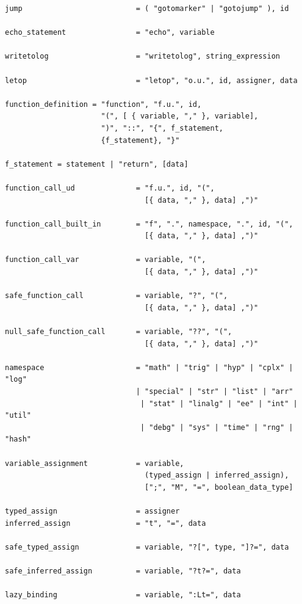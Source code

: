 \begin{verbatim}
jump                          = ( "gotomarker" | "gotojump" ), id

echo_statement                = "echo", variable

writetolog                    = "writetolog", string_expression

letop                         = "letop", "o.u.", id, assigner, data

function_definition = "function", "f.u.", id, 
                      "(", [ { variable, "," }, variable], 
                      ")", "::", "{", f_statement, 
                      {f_statement}, "}"

f_statement = statement | "return", [data]

function_call_ud              = "f.u.", id, "(",
                                [{ data, "," }, data] ,")"

function_call_built_in        = "f", ".", namespace, ".", id, "(",
                                [{ data, "," }, data] ,")"

function_call_var             = variable, "(",
                                [{ data, "," }, data] ,")"

safe_function_call            = variable, "?", "(",
                                [{ data, "," }, data] ,")"

null_safe_function_call       = variable, "??", "(",
                                [{ data, "," }, data] ,")"

namespace                     = "math" | "trig" | "hyp" | "cplx" | "log"
                              | "special" | "str" | "list" | "arr"
                               | "stat" | "linalg" | "ee" | "int" | "util"
                               | "debg" | "sys" | "time" | "rng" | "hash"

variable_assignment           = variable,
                                (typed_assign | inferred_assign),
                                [";", "M", "=", boolean_data_type]

typed_assign                  = assigner
inferred_assign               = "t", "=", data

safe_typed_assign             = variable, "?[", type, "]?=", data

safe_inferred_assign          = variable, "?t?=", data

lazy_binding                  = variable, ":Lt=", data


\end{verbatim}
